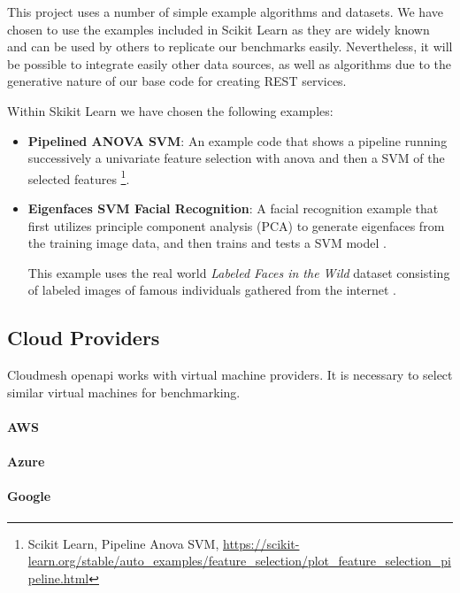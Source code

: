 This project uses a number of simple example algorithms and datasets. We
have chosen to use the examples included in Scikit Learn as they are
widely known and can be used by others to replicate our benchmarks
easily. Nevertheless, it will be possible to integrate easily other data
sources, as well as algorithms due to the generative nature of our base
code for creating REST services.

Within Skikit Learn we have chosen the following examples:

\begin{itemize}
\item
  \textbf{Pipelined ANOVA SVM}: An example code that shows a pipeline
  running successively a univariate feature selection with anova and
  then a SVM of the selected features \footnote{Scikit Learn, Pipeline
    Anova SVM,
    \url{https://scikit-learn.org/stable/auto_examples/feature_selection/plot_feature_selection_pipeline.html}}.
\item
  \textbf{Eigenfaces SVM Facial Recognition}: A facial recognition
  example that first utilizes principle component analysis (PCA) to
  generate eigenfaces from the training image data, and then trains and
  tests a SVM model \cite{www-skikit-learn-faces}.

  This example uses the real world {\em Labeled Faces in the Wild} dataset
  consisting of labeled images of famous individuals gathered from the
  internet \cite{faces-data}.

\end{itemize}

\subsection{Cloud Providers}\label{cloud-providers}

Cloudmesh openapi works with virtual machine providers. It is necessary
to select similar virtual machines for benchmarking.

\hypertarget{aws}{%
\paragraph{AWS}\label{aws}}

\hypertarget{azure}{%
\paragraph{Azure}\label{azure}}

\hypertarget{google}{%
\paragraph{Google}\label{google}}

